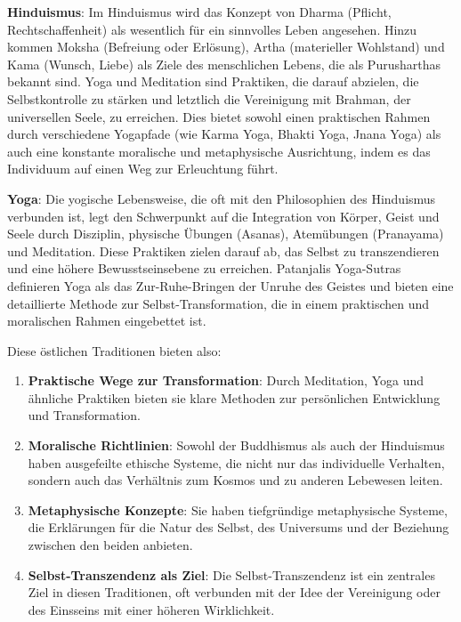 \documentclass[12pt,a4paper]{article}
\begin{document}
\textbf{Hinduismus}:
Im Hinduismus wird das Konzept von Dharma (Pflicht, Rechtschaffenheit) als wesentlich für ein sinnvolles Leben angesehen. Hinzu kommen Moksha (Befreiung oder Erlösung), Artha (materieller Wohlstand) und Kama (Wunsch, Liebe) als Ziele des menschlichen Lebens, die als Purusharthas bekannt sind. Yoga und Meditation sind Praktiken, die darauf abzielen, die Selbstkontrolle zu stärken und letztlich die Vereinigung mit Brahman, der universellen Seele, zu erreichen. Dies bietet sowohl einen praktischen Rahmen durch verschiedene Yogapfade (wie Karma Yoga, Bhakti Yoga, Jnana Yoga) als auch eine konstante moralische und metaphysische Ausrichtung, indem es das Individuum auf einen Weg zur Erleuchtung führt.

\textbf{Yoga}:
Die yogische Lebensweise, die oft mit den Philosophien des Hinduismus verbunden ist, legt den Schwerpunkt auf die Integration von Körper, Geist und Seele durch Disziplin, physische Übungen (Asanas), Atemübungen (Pranayama) und Meditation. Diese Praktiken zielen darauf ab, das Selbst zu transzendieren und eine höhere Bewusstseinsebene zu erreichen. Patanjalis Yoga-Sutras definieren Yoga als das Zur-Ruhe-Bringen der Unruhe des Geistes und bieten eine detaillierte Methode zur Selbst-Transformation, die in einem praktischen und moralischen Rahmen eingebettet ist.

Diese östlichen Traditionen bieten also:

\begin{enumerate}
    \item
\textbf{Praktische Wege zur Transformation}: Durch Meditation, Yoga und ähnliche Praktiken bieten sie klare Methoden zur persönlichen Entwicklung und Transformation.

\item
\textbf{Moralische Richtlinien}: Sowohl der Buddhismus als auch der Hinduismus haben ausgefeilte ethische Systeme, die nicht nur das individuelle Verhalten, sondern auch das Verhältnis zum Kosmos und zu anderen Lebewesen leiten.

\item
\textbf{Metaphysische Konzepte}: Sie haben tiefgründige metaphysische Systeme, die Erklärungen für die Natur des Selbst, des Universums und der Beziehung zwischen den beiden anbieten.

\item
\textbf{Selbst-Transzendenz als Ziel}: Die Selbst-Transzendenz ist ein zentrales Ziel in diesen Traditionen, oft verbunden mit der Idee der Vereinigung oder des Einsseins mit einer höheren Wirklichkeit.
\end{enumerate}
\end{document}
